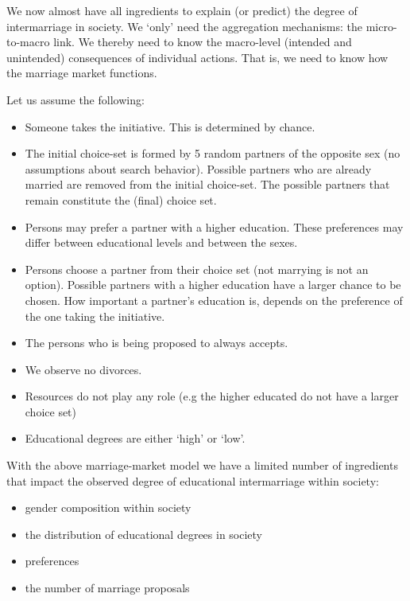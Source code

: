 \documentclass[
]{book}
\providecommand{\tightlist}{%
  \setlength{\itemsep}{0pt}\setlength{\parskip}{0pt}}
\begin{document}
We now almost have all ingredients to explain (or predict) the degree of intermarriage in society. We `only' need the aggregation mechanisms: the micro-to-macro link. We thereby need to know the macro-level (intended and unintended) consequences of individual actions. That is, we need to know how the marriage market functions.~

Let us assume the following:

\begin{itemize}
\tightlist
\item
  Someone takes the initiative. This is determined by chance.
\item
  The initial choice-set is formed by 5 random partners of the opposite sex (no assumptions about search behavior). Possible partners who are already married are removed from the initial choice-set. The possible partners that remain constitute the (final) choice set.\\
\item
  Persons may prefer a partner with a higher education. These preferences may differ between educational levels and between the sexes.
\item
  Persons choose a partner from their choice set (not marrying is not an option). Possible partners with a higher education have a larger chance to be chosen. How important a partner's education is, depends on the preference of the one taking the initiative.
\item
  The persons who is being proposed to always accepts.
\item
  We observe no divorces.
\item
  Resources do not play any role (e.g the higher educated do not have a larger choice set)
\item
  Educational degrees are either `high' or `low'.
\end{itemize}

With the above marriage-market model we have a limited number of ingredients that impact the observed degree of educational intermarriage within society:

\begin{itemize}
\tightlist
\item
  gender composition within society\\
\item
  the distribution of educational degrees in society\\
\item
  preferences\\
\item
  the number of marriage proposals
\end{itemize}
\end{document}
